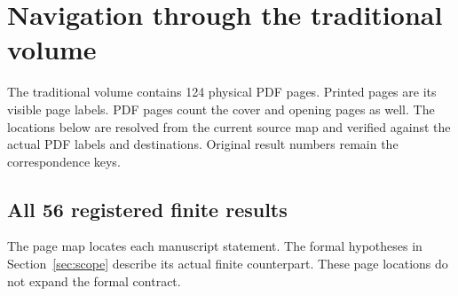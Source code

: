 \section{Navigation through the traditional volume}
\label{sec:traditional-navigation}
The traditional volume contains 124 physical PDF pages. Printed pages are its visible page labels. PDF pages count the cover and opening pages as well. The locations below are resolved from the current source map and verified against the actual PDF labels and destinations. Original result numbers remain the correspondence keys.

\subsection{All 56 registered finite results}
The page map locates each manuscript statement. The formal hypotheses in Section~\ref{sec:scope} describe its actual finite counterpart. These page locations do not expand the formal contract.

